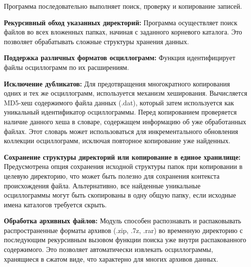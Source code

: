 Программа последовательно выполняет поиск, проверку и копирование записей.\par\vspace{0.2cm}

\textbf{Рекурсивный обход указанных директорий:} Программа осуществляет поиск файлов во всех вложенных папках, начиная с заданного корневого каталога. Это позволяет обрабатывать сложные структуры хранения данных.\par\vspace{0.2cm}

\textbf{Поддержка различных форматов осциллограмм:} Функция идентифицирует файлы осциллограмм по их расширениям.\par\vspace{0.2cm}

\textbf{Исключение дубликатов:} Для предотвращения многократного копирования одних и тех же осциллограмм, используется механизм хеширования. Вычисляется MD5-хеш содержимого файла данных (.dat), который затем используется как уникальный идентификатор осциллограммы. Перед копированием проверяется наличие данного хеша в словаре, содержащем информацию об уже обработанных файлах. Этот словарь может использоваться для инкрементального обновления коллекции осциллограмм, исключая повторное копирование уже найденных.\par\vspace{0.2cm}

\textbf{Сохранение структуры директорий или копирование в единое хранилище:} Предусмотрена опция сохранения исходной структуры папок при копировании в целевую директорию, что может быть полезно для сохранения контекста происхождения файла. Альтернативно, все найденные уникальные осциллограммы могут быть скопированы в одну общую папку, если исходные имена каталогов требуется скрыть.\par\vspace{0.2cm}

\textbf{Обработка архивных файлов:} Модуль способен распознавать и распаковывать распространенные форматы архивов (.zip, .7z, .rar) во временную директорию с последующим рекурсивным вызовом функции поиска уже внутри распакованного содержимого. Это позволяет автоматически извлекать осциллограммы, хранящиеся в сжатом виде, что характерно для многих архивов данных.\par\vspace{0.2cm}

